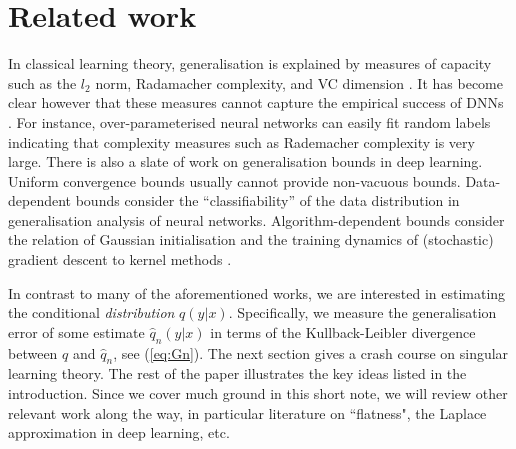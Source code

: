 \documentclass{article} %
\begin{document}
\section{Related work}
In classical learning theory, generalisation is explained by measures of capacity such as the $l_2$ norm, Radamacher complexity, and VC dimension \citep{bousquet2003introduction}. It has become clear however that these measures cannot capture the empirical success of DNNs \citep{zhang_understanding_2017}. 
For instance, over-parameterised neural networks can easily fit random labels \citep{zhang_understanding_2017,du2018gradient,allen2019convergence} indicating that complexity measures such as Rademacher complexity is very large.
There is also a slate of work on generalisation bounds in deep learning. Uniform convergence bounds \citep{neyshabur2015norm,bartlett2017spectrally,neyshabur2019towards,arora2018stronger} usually cannot provide non-vacuous bounds.
Data-dependent bounds \citep{brutzkus2018sgd,li2018learning,allen2019learning} consider the ``classifiability'' of the data distribution in generalisation analysis of neural networks.
Algorithm-dependent bounds \citep{daniely2017sgd,arora2019fine,yehudai2019power,cao2019generalization} consider the relation of Gaussian initialisation and the training dynamics of (stochastic) gradient descent to kernel methods \citep{jacot2018neural}.

In contrast to many of the aforementioned works, we are interested in estimating the conditional \textit{distribution} $q(y|x)$. Specifically, we measure the generalisation error of some estimate $\hat q_n(y|x)$ in terms of the Kullback-Leibler divergence between $q$ and $\hat q_n$, see (\ref{eq:Gn}). The next section gives a crash course on singular learning theory. The rest of the paper illustrates the key ideas listed in the introduction. Since we cover much ground in this short note, we will review other relevant work along the way, in particular literature on ``flatness", the Laplace approximation in deep learning, etc. 
\end{document}
